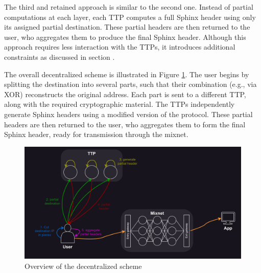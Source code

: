 The third and retained approach is similar to the second one.
Instead of partial computations at each layer, each TTP computes a full Sphinx header using only its assigned partial destination. 
These partial headers are then returned to the user, who aggregates them to produce the final Sphinx header.
Although this approach requires less interaction with the TTPs, it introduces additional constraints as discussed in section .

The overall decentralized scheme is illustrated in Figure \ref{fig:overall_schema}. 
The user begins by splitting the destination into several parts, such that their combination (e.g., via XOR) reconstructs the original address. 
Each part is sent to a different TTP, along with the required cryptographic material. 
The TTPs independently generate Sphinx headers using a modified version of the protocol.  
These partial headers are then returned to the user, who aggregates them to form the final Sphinx header, ready for transmission through the mixnet.

\begin{figure}[H]
    \centering
    \includegraphics[width=1\linewidth]{Images/sphinx_ttp.png}
    \caption{Overview of the decentralized scheme}
    \label{fig:overall_schema}
\end{figure}


